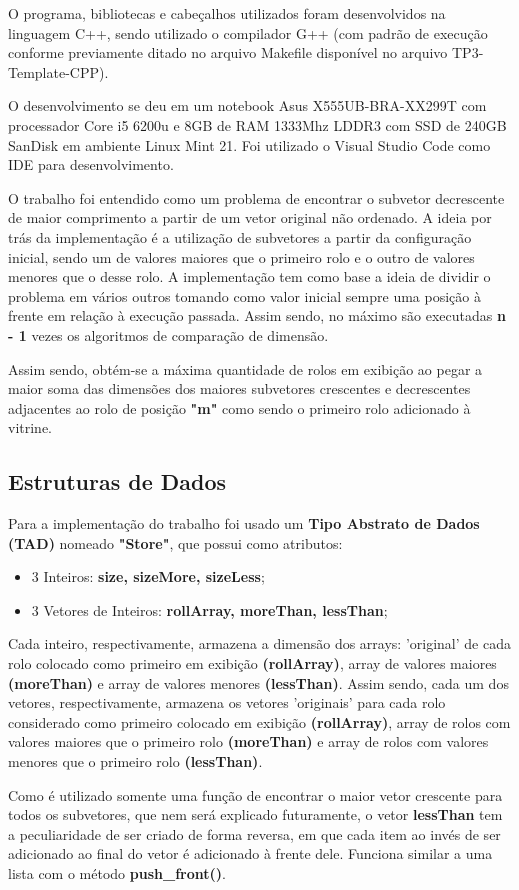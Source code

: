 \documentclass[12pt]{article}
\begin{document}
\par O programa, bibliotecas e cabeçalhos utilizados foram desenvolvidos na linguagem C++,
sendo utilizado o compilador G++ (com padrão de execução conforme previamente ditado no
arquivo Makefile disponível no arquivo TP3-Template-CPP).
\par O desenvolvimento se deu em um notebook Asus X555UB-BRA-XX299T com processador Core i5 6200u e 8GB de RAM 1333Mhz LDDR3 com SSD de 240GB SanDisk em ambiente Linux Mint 21. Foi utilizado o Visual Studio Code como IDE para desenvolvimento.
\par O trabalho foi entendido como um problema de encontrar o subvetor decrescente de maior comprimento a partir de um vetor original não ordenado. A ideia por trás da implementação é a utilização de subvetores a partir da configuração inicial, sendo um de valores maiores que o primeiro rolo e o outro de valores menores que o desse rolo. A implementação tem como base a ideia de dividir o problema em vários outros tomando como valor inicial sempre uma posição à frente em relação à execução passada. Assim sendo, no máximo são executadas \textbf{n - 1} vezes os algoritmos de comparação de dimensão.
\par Assim sendo, obtém-se a máxima quantidade de rolos em exibição ao pegar a maior soma das dimensões dos maiores subvetores crescentes e decrescentes adjacentes ao rolo de posição \textbf{"m"} como sendo o primeiro rolo adicionado à vitrine.

    \subsection{Estruturas de Dados}
    \par Para a implementação do trabalho foi usado um \textbf{Tipo Abstrato de Dados (TAD)} nomeado \textbf{"Store"}, que possui como atributos:
    \begin{itemize}
    \item 3 Inteiros: \textbf{size, sizeMore, sizeLess};
    \item 3 Vetores de Inteiros: \textbf{rollArray, moreThan, lessThan};
    \end{itemize}
    \par Cada inteiro, respectivamente, armazena a dimensão dos arrays: 'original' de cada rolo colocado como primeiro em exibição \textbf{(rollArray)}, array de valores maiores \textbf{(moreThan)} e array de valores menores \textbf{(lessThan)}. Assim sendo, cada um dos vetores, respectivamente, armazena os vetores 'originais' para cada rolo considerado como primeiro colocado em exibição \textbf{(rollArray)}, array de rolos com valores maiores que o primeiro rolo \textbf{(moreThan)} e array de rolos com valores menores que o primeiro rolo \textbf{(lessThan)}.
    \par Como é utilizado somente uma função de encontrar o maior vetor crescente para todos os subvetores, que nem será explicado futuramente, o vetor \textbf{lessThan} tem a peculiaridade de ser criado de forma reversa, em que cada item ao invés de ser adicionado ao final do vetor é adicionado à frente dele. Funciona similar a uma lista com o método \textbf{push\_front()}.
\end{document}
